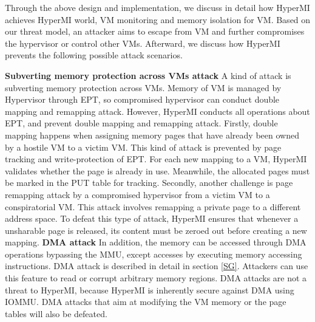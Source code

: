 \documentclass[conference]{IEEEtran}
\begin{document}
Through the above design and implementation, we discuss in detail how HyperMI achieves HyperMI world,
VM monitoring and memory isolation for VM.
Based on our threat model, an attacker aims to escape from VM and further compromises the hypervisor or control other VMs.
Afterward, we discuss how HyperMI prevents the following possible attack scenarios.

\textbf{Subverting memory protection across VMs attack}
A kind of attack is subverting memory protection across VMs. Memory of VM is managed by Hypervisor through EPT, so compromised hypervisor can conduct double mapping and remapping attack. However, HyperMI conducts all operations about EPT, and prevent double mapping and remapping attack.
Firstly, double mapping happens when assigning memory pages that have already been owned by a hostile VM to a victim VM. This kind of attack is prevented by page tracking and write-protection of EPT. For each new mapping to a VM, HyperMI validates whether the page is already in use. Meanwhile, the allocated pages must be marked in the PUT table for tracking. Secondly, another challenge is page remapping attack by a compromised hypervisor from a victim VM to a conspiratorial VM. This attack involves remapping a private page to a different address space. To defeat this type of attack, HyperMI ensures that whenever a unsharable page is released, its content must be zeroed out before creating a new mapping.
\textbf{DMA attack}
In addition, the memory can be accessed through DMA operations bypassing the MMU, except accesses by executing memory accessing instructions. DMA attack is described in detail in section \ref{SG}. Attackers can use this feature to read or corrupt arbitrary memory regions. DMA attacks are not a threat to HyperMI, because HyperMI is inherently secure against DMA using IOMMU. DMA attacks that aim at modifying the VM memory or the page tables will also be defeated.
\end{document}
